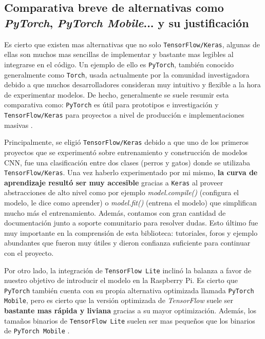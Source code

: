     
\subsection{Comparativa breve de alternativas como \textit{PyTorch}, \textit{PyTorch Mobile}...  y su justificación}\label{comparativa-alterbativas-Pytorch}

Es cierto que existen mas alternativas que no solo \texttt{TensorFlow/Keras}, algunas de ellas son muchos mas sencillas de implementar y bastante mas legibles al integrarse en el código. Un ejemplo de ello es \texttt{PyTorch}, también conocido generalmente como \texttt{Torch}, usada actualmente por la comunidad investigadora debido a que muchos desarrolladores consideran muy intuitivo y flexible a la hora de experimentar modelos. De hecho, generalmente se suele resumir esta comparativa como: \texttt{PyTorch} es útil para prototipos e investigación y \texttt{TensorFlow/Keras} para proyectos a nivel de producción e implementaciones masivas \cite{web:keras_vs_torch}. 
    

Principalmente, se eligió \texttt{TensorFlow/Keras} debido a que uno de los primeros proyectos que se experimentó sobre entrenamiento y construcción de modelos CNN, fue una clasificación entre dos clases (perros y gatos) donde se utilizaba \texttt{TensorFlow/Keras}. Una vez haberlo experimentado por mi mismo, \textbf{la curva de aprendizaje resultó ser muy accesible} gracias a \texttt{Keras} al proveer abstracciones de alto nivel como por ejemplo \textit{model.compile()} (configura el modelo, le dice como aprender) o \textit{model.fit()} (entrena el modelo) que simplifican mucho más el entrenamiento. Además, contamos con gran cantidad de documentación junto a soporte comunitario para resolver dudas. Esto último fue muy importante en la comprensión de esta biblioteca: tutoriales, foros y ejemplo abundantes que fueron muy útiles y dieron confianza suficiente para continuar con el proyecto.
    

Por otro lado, la integración de \texttt{TensorFlow Lite} inclinó la balanza a favor de nuestro objetivo de introducir el modelo en la Raspberry Pi. Es cierto que \texttt{PyTorch} también cuenta con su propia alternativa optimizada llamada \texttt{PyTorch Mobile}, pero es cierto que la versión optimizada de \textit{TensorFlow} suele ser \textbf{bastante mas rápida y liviana} gracias a su mayor optimización. Además, los tamaños binarios de \texttt{TensorFlow Lite} suelen ser mas pequeños que los binarios de \texttt{PyTorch Mobile} \cite{web:tflite_vs_torchmob}. 
    

